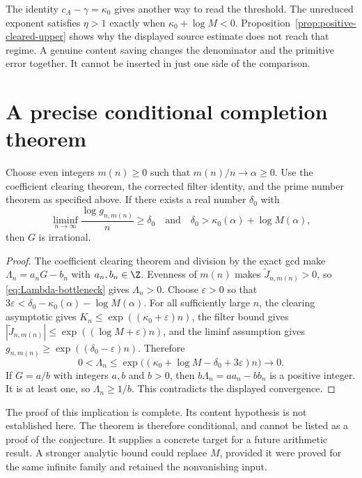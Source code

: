 The identity $c_A-\gamma=\kappa_0$ gives another way to read the threshold. The unreduced exponent satisfies $\eta>1$ exactly when $\kappa_0+\log M<0$. Proposition~\ref{prop:positive-cleared-upper} shows why the displayed source estimate does not reach that regime. A genuine content saving changes the denominator and the primitive error together. It cannot be inserted in just one side of the comparison.

\section{A precise conditional completion theorem}

\begin{theorem}
\label{thm:conditional-completion}
Choose even integers $m(n)\geq0$ such that $m(n)/n\to\alpha\geq0$. Use the coefficient clearing theorem, the corrected filter identity, and the prime number theorem as specified above. If there exists a real number $\delta_0$ with
\begin{equation}
 \liminf_{n\to\infty}\frac{\log g_{n,m(n)}}{n}\geq\delta_0
 \quad\text{and}\quad
 \delta_0>\kappa_0(\alpha)+\log M(\alpha),
 \label{eq:conditional-content-hypothesis}
\end{equation}
then $G$ is irrational.
\end{theorem}

\begin{proof}
The coefficient clearing theorem and division by the exact gcd make $\Lambda_n=a_nG-b_n$ with $a_n,b_n\in\Z$. Evenness of $m(n)$ makes $\widetilde J_{n,m(n)}>0$, so \eqref{eq:Lambda-bottleneck} gives $\Lambda_n>0$. Choose $\varepsilon>0$ so that $3\varepsilon<\delta_0-\kappa_0(\alpha)-\log M(\alpha)$. For all sufficiently large $n$, the clearing asymptotic gives $K_n\leq\exp((\kappa_0+\varepsilon)n)$, the filter bound gives $|\widetilde J_{n,m(n)}|\leq\exp((\log M+\varepsilon)n)$, and the liminf assumption gives $g_{n,m(n)}\geq\exp((\delta_0-\varepsilon)n)$. Therefore
\begin{equation*}
 0<\Lambda_n\leq
 \exp\bigl((\kappa_0+\log M-\delta_0+3\varepsilon)n\bigr)
 \longrightarrow0.
\end{equation*}
If $G=a/b$ with integers $a,b$ and $b>0$, then $b\Lambda_n=aa_n-bb_n$ is a positive integer. It is at least one, so $\Lambda_n\geq1/b$. This contradicts the displayed convergence.
\end{proof}

The proof of this implication is complete. Its content hypothesis is not established here. The theorem is therefore conditional, and cannot be listed as a proof of the conjecture. It supplies a concrete target for a future arithmetic result. A stronger analytic bound could replace $M$, provided it were proved for the same infinite family and retained the nonvanishing input.

